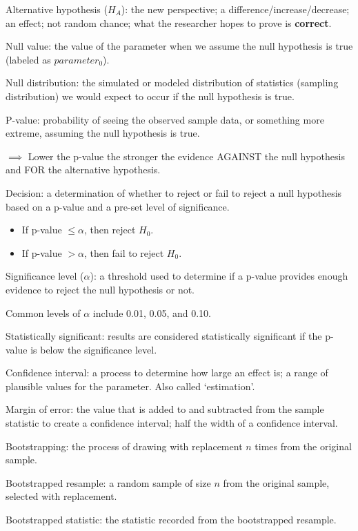 \documentclass[
]{report}
\newcommand{\rgi}{\hspace{24pt}}  %
\begin{document}
Alternative hypothesis (\(H_A\)): the new perspective; a difference/increase/decrease; an effect; not random chance; what the researcher hopes to prove is \textbf{correct}.

Null value: the value of the parameter when we assume the null hypothesis is true (labeled as \(parameter_0\)).

Null distribution: the simulated or modeled distribution of statistics (sampling distribution) we would expect to occur if the null hypothesis is true.

P-value: probability of seeing the observed sample data, or something more extreme, assuming the null hypothesis is true.

\(\implies\) Lower the p-value the stronger the evidence AGAINST the null hypothesis and FOR the alternative hypothesis.

Decision: a determination of whether to reject or fail to reject a null hypothesis based on a p-value and a pre-set level of significance.

\begin{itemize}
\item
  If p-value \(\leq \alpha\), then reject \(H_0\).
\item
  If p-value \(> \alpha\), then fail to reject \(H_0\).
\end{itemize}

Significance level (\(\alpha\)): a threshold used to determine if a p-value provides enough evidence to reject the null hypothesis or not.

\rgi Common levels of \(\alpha\) include 0.01, 0.05, and 0.10.

Statistically significant: results are considered statistically significant if the p-value is below the significance level.

Confidence interval: a process to determine how large an effect is; a range of plausible values for the parameter. Also called `estimation'.

Margin of error: the value that is added to and subtracted from the sample statistic to create a confidence interval; half the width of a confidence interval.

Bootstrapping: the process of drawing with replacement \(n\) times from the original sample.

Bootstrapped resample: a random sample of size \(n\) from the original sample, selected with replacement.

Bootstrapped statistic: the statistic recorded from the bootstrapped resample.
\end{document}
